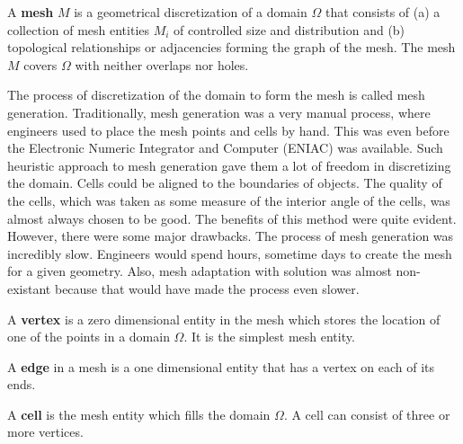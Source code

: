 \begin{definition}
	A \textbf{mesh} $M$ is a geometrical discretization of a domain $\Omega$ that consists of (a) a collection of mesh entities $M_i$ of controlled size and distribution and (b) topological relationships or adjacencies forming the graph of the mesh. The mesh $M$ covers $\Omega$ with neither overlaps nor holes.
\end{definition}

The process of discretization of the domain to form the mesh is called mesh generation. Traditionally, mesh generation was a very manual process, where engineers used to place the mesh points and cells by hand. This was even before the Electronic Numeric Integrator and Computer (ENIAC) was available. Such heuristic approach to mesh generation gave them a lot of freedom in discretizing the domain. Cells could be aligned to the boundaries of objects. The quality of the cells, which was taken as some measure of the interior angle of the cells, was almost always chosen to be good. The benefits of this method were quite evident. However, there were some major drawbacks. The process of mesh generation was incredibly slow. Engineers would spend hours, sometime days to create the mesh for a given geometry. Also, mesh adaptation with solution was almost non-existant because that would have made the process even slower.

\begin{definition}
	A \textbf{vertex} is a zero dimensional entity in the mesh which stores the location of one of the points in a domain $\Omega$. It is the simplest mesh entity.
\end{definition}

\begin{definition}
	A \textbf{edge} in a mesh is a one dimensional entity that has a vertex on each of its ends.
\end{definition}

\begin{definition}
	A \textbf{cell} is the mesh entity which fills the domain $\Omega$. A cell can consist of three or more vertices.
\end{definition}

